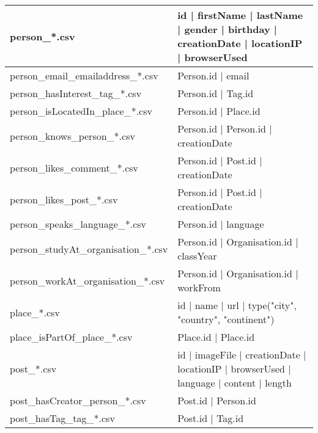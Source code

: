 \begin{table}[htb]
\begin{tabular}{|p{4.6cm}|p{9.8cm}|}
    	person\_*.csv                           & id | firstName | lastName | gender | birthday | creationDate | locationIP | browserUsed \\ \hline
    	person\_email\_emailaddress\_*.csv      & Person.id | email                                                                       \\ \hline
    	person\_hasInterest\_tag\_*.csv         & Person.id | Tag.id                                                                      \\ \hline
    	person\_isLocatedIn\_place\_*.csv       & Person.id | Place.id                                                                    \\ \hline
    	person\_knows\_person\_*.csv            & Person.id | Person.id | creationDate                                                    \\ \hline
    	person\_likes\_comment\_*.csv           & Person.id | Post.id | creationDate                                                      \\ \hline
    	person\_likes\_post\_*.csv              & Person.id | Post.id | creationDate                                                      \\ \hline
    	person\_speaks\_language\_*.csv         & Person.id | language                                                                    \\ \hline
    	person\_studyAt\_organisation\_*.csv    & Person.id | Organisation.id | classYear                                                 \\ \hline
    	person\_workAt\_organisation\_*.csv     & Person.id | Organisation.id | workFrom                                                  \\ \hline
    	place\_*.csv                            & id | name | url | type({"city", "country", "continent"})                                \\ \hline
    	place\_isPartOf\_place\_*.csv           & Place.id | Place.id                                                                     \\ \hline
    	post\_*.csv                             & id | imageFile | creationDate | locationIP | browserUsed | language | content | length  \\ \hline
    	post\_hasCreator\_person\_*.csv         & Post.id | Person.id                                                                     \\ \hline
    	post\_hasTag\_tag\_*.csv                & Post.id | Tag.id                                                                        \\ \hline

\end{tabular}
\end{table}
